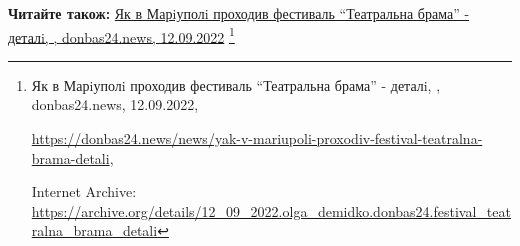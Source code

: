  
 
 
 
 

\def\pubIA{https://archive.org/details/12_09_2022.olga_demidko.donbas24.festival_teatralna_brama_detali}
\def\pubTitle{Як в Марiуполi проходив фестиваль \enquote{Театральна брама} - деталi}
\def\pubDate{12.09.2022}
\def\pubOrigin{https://donbas24.news/news/yak-v-mariupoli-proxodiv-festival-teatralna-brama-detali}
\def\pubAuthor{\pubAuthorDemidko}
\def\pubSite{donbas24.news}

\textbf{Читайте також:} \href{\pubIA}{%
\pubTitle, \pubAuthor, \pubSite, \pubDate}%
\footnote{\pubTitle, \pubAuthor, \pubSite, \pubDate, \par\url{\pubOrigin}, \par Internet Archive: \url{\pubIA}}
